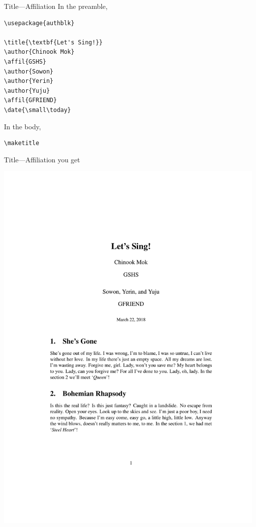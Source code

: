 \documentclass[12pt]{gshs_lecture}
\begin{document}
\begin{frame}[t,fragile]{Title---Affiliation}\small
In the preamble,
\begin{block}{}
\begin{lstlisting}
\usepackage{authblk}

\title{\textbf{Let's Sing!}}
\author{Chinook Mok}
\affil{GSHS}
\author{Sowon}
\author{Yerin}
\author{Yuju}
\affil{GFRIEND}
\date{\small\today}
\end{lstlisting}
\end{block}
In the body,
\begin{block}{}
\begin{lstlisting}
\maketitle
\end{lstlisting}
\end{block}
\end{frame}

\begin{frame}[t]{Title---Affiliation}\small
you get
\begin{center}
\begin{framed}
\includegraphics[width=\textwidth,trim={0cm 13cm 0cm 4cm},clip]{./test_article/article008.pdf}
\end{framed}
\end{center}
\end{frame}
\end{document}
